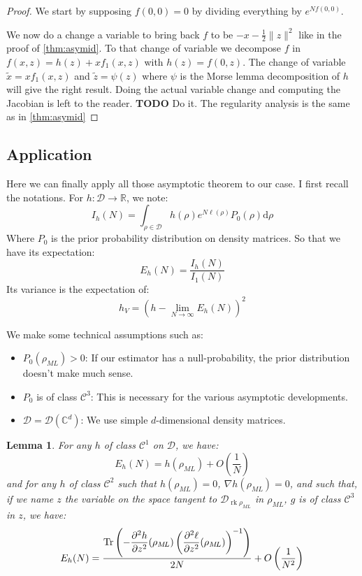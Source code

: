 \documentclass[10pt,a4paper]{report}
\theoremstyle{plain}
\newtheorem{lem}[thm]{Lemma}
\theoremstyle{definition}
\theoremstyle{remark}
\newcommand{\R}{\ensuremath{\mathbb{R}}}
\newcommand{\C}{\ensuremath{\mathbb{C}}}
\newcommand{\TODO}{\textbf{TODO}}
\newcommand{\dd}{\mathrm{d}}
\newcommand{\dparn}[3]{\frac{\partial^{#3} {#1}}{\partial{#2}^{#3}}}
\DeclareMathOperator{\Tr}{Tr}
\DeclareMathOperator{\rk}{rk}
\newcommand{\class}[1]{{\mathscr{C}^{#1}}}
\newcommand{\ml}{_{M\!L}}
\begin{document}
\begin{proof}
  We start by supposing $f(0,0) = 0$ by dividing everything by $e^{Nf(0,0)}$.

  We now do a change a variable to bring back $f$ to be $-x -\frac12\|z\|^2$ like in
  the proof of \cref{thm:asymid}.
  To that change of variable we decompose $f$ in $f(x,z) = h(z) + xf_1(x,z)$
  with $h(z) = f(0,z)$. The change of variable $\tilde x = xf_1(x,z)$ and
  $\tilde z = \psi(z)$ where $\psi$ is the Morse lemma decomposition of $h$ will
  give the right result. Doing the actual variable change and computing the
  Jacobian is left to the reader.
  \TODO{} Do it.
  The regularity analysis is the same as in \cref{thm:asymid}
\end{proof}



\subsection{Application}

Here we can finally apply all those asymptotic theorem to our case. I first recall the
notations. For $h : \mathcal{D} \to \R$, we note:
\begin{equation}
I_h(N) = \int_{\rho\in\mathcal{D}} h(\rho) e^{N\ell(\rho)} P_0(\rho) \dd \rho
\end{equation}
Where $P_0$ is the prior probability distribution on density matrices.
So that we have its expectation:
\begin{equation}
E_h(N) = \frac{I_h(N)}{I_1(N)}
\end{equation}
Its variance is the expectation of:
\begin{equation}
h_V = {\left(h - \lim_{N \to \infty} E_h(N)\right)}^2
\end{equation}

We make some technical assumptions such as:
\begin{itemize}
\item $P_0(\rho\ml) > 0$: If our estimator has a null-probability, the prior
  distribution doesn't make much sense.
\item $P_0$ is of class $\class 3$: This is necessary for the various asymptotic developments.
\item $\mathcal{D} = \mathcal{D}(\C^d)$: We use simple $d$-dimensional density matrices.
\end{itemize}


\begin{lem}\label{lem:asymain}
  For any $h$ of class $\class 1$ on $\mathcal{D}$, we have:
  \[E_h(N) = h(\rho\ml) + O\left(\frac 1N\right)\]
  and for any $h$  of class $\class 2$ such that $h(\rho\ml) = 0$, $\nabla
  h(\rho\ml) = 0$, and such that,
  if we name $z$ the variable on the space tangent to $\mathcal{D}_{\rk
    \rho\ml}$ in $\rho\ml$, $g$ is of class $\class 3$ in $z$, we have:
  \[E_h(N) = \frac{\displaystyle \Tr \left( - \dparn h z 2 (\rho\ml)  \left( \dparn \ell z
        2(\rho\ml)\right)\inv\right)}{2N} + O\left(\frac 1 {N^2}\right)\]
\end{lem}
\end{document}
